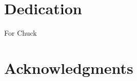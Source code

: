 \documentclass[11pt, oneside, openany]{scrbook}
\begin{document}
\section*{Dedication}
\begin{center}
  \vfill
  For Chuck
  \vfill
  \null
\end{center}
%


\newpage
{}
\section*{Acknowledgments}



\setcounter{tocdepth}{1}
\tableofcontents

\listoftables

\listoffigures
\mainmatter





\backmatter
\end{document}
